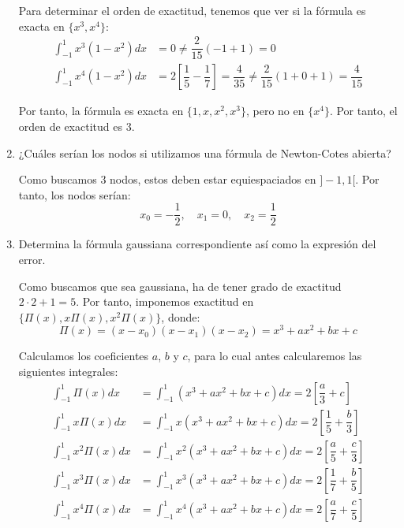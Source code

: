 \begin{ejercicio}
\begin{enumerate}
        Para determinar el orden de exactitud, tenemos que ver si la fórmula es exacta en $\{x^3,x^4\}$:
        \begin{align*}
            \int_{-1}^{1} x^3(1 - x^2)dx &= 0 \neq \dfrac{2}{15}\left(-1+1\right) = 0\\
            \int_{-1}^{1} x^4(1 - x^2)dx &= 2\left[\dfrac{1}{5} - \dfrac{1}{7}\right] = \dfrac{4}{35} \neq \dfrac{2}{15}\left(1+0+1\right) = \dfrac{4}{15}
        \end{align*}

        Por tanto, la fórmula es exacta en $\{1,x,x^2,x^3\}$, pero no en $\{x^4\}$. Por tanto, el orden de exactitud es $3$.
        \item ¿Cuáles serían los nodos si utilizamos una fórmula de Newton-Cotes abierta?
        
        Como buscamos $3$ nodos, estos deben estar equiespaciados en $]-1,1[$. Por tanto, los nodos serían:
        \begin{equation*}
            x_0 = -\frac{1}{2}, \quad x_1 = 0, \quad x_2 = \frac{1}{2}
        \end{equation*}
        \item\label{ap:3} Determina la fórmula gaussiana correspondiente así como la expresión del error.
        
        Como buscamos que sea gaussiana, ha de tener grado de exactitud $2\cdot 2+1 = 5$. Por tanto, imponemos exactitud en $\{\Pi(x), x\Pi(x), x^2\Pi(x)\}$, donde:
        \begin{equation*}
            \Pi(x) = (x-x_0)(x-x_1)(x-x_2) = x^3+ax^2 + bx + c
        \end{equation*}

        Calculamos los coeficientes $a$, $b$ y $c$, para lo cual antes calcularemos las siguientes integrales:
        \begin{align*}
            \int_{-1}^{1} \Pi(x)dx &= \int_{-1}^{1} (x^3 + ax^2 + bx + c)dx = 2\left[\dfrac{a}{3} + c\right]\\
            \int_{-1}^{1} x\Pi(x)dx &= \int_{-1}^{1} x(x^3 + ax^2 + bx + c)dx = 2\left[\dfrac{1}{5} + \dfrac{b}{3}\right]\\
            \int_{-1}^{1} x^2\Pi(x)dx &= \int_{-1}^{1} x^2(x^3 + ax^2 + bx + c)dx = 2\left[\dfrac{a}{5} + \dfrac{c}{3}\right]\\
            \int_{-1}^{1} x^3\Pi(x)dx &= \int_{-1}^{1} x^3(x^3 + ax^2 + bx + c)dx = 2\left[\dfrac{1}{7} + \dfrac{b}{5}\right]\\
            \int_{-1}^{1} x^4\Pi(x)dx &= \int_{-1}^{1} x^4(x^3 + ax^2 + bx + c)dx = 2\left[\dfrac{a}{7} + \dfrac{c}{5}\right]\\
        \end{align*}


\end{enumerate}
\end{ejercicio}
